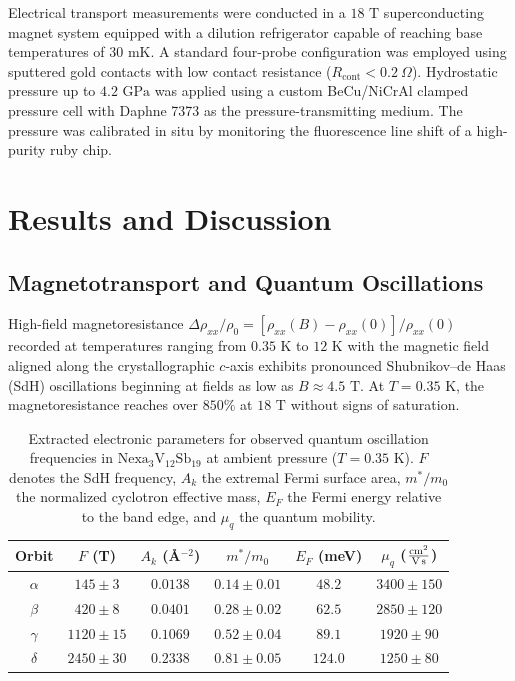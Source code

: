 \documentclass[aps,prb,reprint,superscriptaddress,amsmath,amssymb,citeautoscript]{revtex4-2}
\begin{document}
Electrical transport measurements were conducted in a $18\text{~T}$ superconducting magnet system equipped with a dilution refrigerator capable of reaching base temperatures of $30\text{~mK}$. A standard four-probe configuration was employed using sputtered gold contacts with low contact resistance ($R_{\text{cont}} < 0.2~\Omega$). Hydrostatic pressure up to $4.2\text{~GPa}$ was applied using a custom BeCu/NiCrAl clamped pressure cell with Daphne 7373 as the pressure-transmitting medium. The pressure was calibrated in situ by monitoring the fluorescence line shift of a high-purity ruby chip.

\section{Results and Discussion}

\subsection{Magnetotransport and Quantum Oscillations}
High-field magnetoresistance $\Delta \rho_{xx} / \rho_0 = [\rho_{xx}(B) - \rho_{xx}(0)] / \rho_{xx}(0)$ recorded at temperatures ranging from $0.35\text{~K}$ to $12\text{~K}$ with the magnetic field aligned along the crystallographic $c$-axis exhibits pronounced Shubnikov--de Haas (SdH) oscillations beginning at fields as low as $B \approx 4.5\text{~T}$. At $T = 0.35\text{~K}$, the magnetoresistance reaches over $850\%$ at $18\text{~T}$ without signs of saturation.

\begin{table}[t]
\caption{\label{tab:bands}Extracted electronic parameters for observed quantum oscillation frequencies in $\mathrm{Nexa}_{3}\mathrm{V}_{12}\mathrm{Sb}_{19}$ at ambient pressure ($T = 0.35\text{~K}$). $F$ denotes the SdH frequency, $A_k$ the extremal Fermi surface area, $m^*/m_0$ the normalized cyclotron effective mass, $E_F$ the Fermi energy relative to the band edge, and $\mu_q$ the quantum mobility.}
\begin{ruledtabular}
\footnotesize
\begin{tabular}{cccccc}
Orbit & $F$ (T) & $A_k$ (\AA$^{-2}$) & $m^*/m_0$ & $E_F$ (meV) & $\mu_q$ ($\frac{\text{cm}^2}{\text{V\,s}}$) \\
\hline
$\alpha$ & $145 \pm 3$  & $0.0138$ & $0.14 \pm 0.01$ & $48.2$ & $3400 \pm 150$ \\
$\beta$  & $420 \pm 8$  & $0.0401$ & $0.28 \pm 0.02$ & $62.5$ & $2850 \pm 120$ \\
$\gamma$ & $1120 \pm 15$ & $0.1069$ & $0.52 \pm 0.04$ & $89.1$ & $1920 \pm 90$  \\
$\delta$ & $2450 \pm 30$ & $0.2338$ & $0.81 \pm 0.05$ & $124.0$& $1250 \pm 80$  \\
\end{tabular}
\end{ruledtabular}
\end{table}
\end{document}
